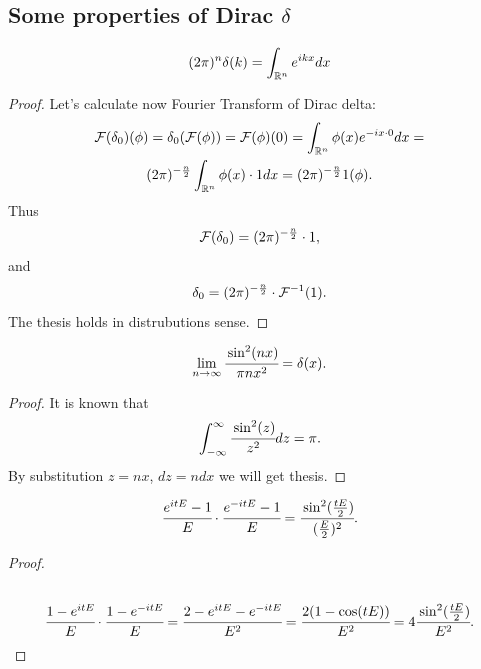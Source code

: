 \documentclass[main.tex]{subfiles}
\begin{document}
\subsection{Some properties of Dirac $\delta$}
\label{dirac-delta-basic}
\begin{fact}
\begin{equation}
\\
(2\pi)^{n}\delta(k) = \int_{\mathbb{R}^n} e^{ikx}dx\\
\end{equation}
\end{fact}
\begin{proof}
Let's calculate now Fourier Transform of Dirac delta:
\begin{multline}
\mathcal{F}(\delta_0)(\phi) = \delta_0 (\mathcal{F}(\phi)) = \mathcal{F}(\phi)(0) =  \int_{\mathbb{R}^n} \phi(x) e^{-ix\cdot 0}dx = \\
(2\pi)^{-\frac{n}{2}} \int_{\mathbb{R}^n} \phi(x) \cdot 1 dx =  (2\pi)^{-\frac{n}{2}} 1(\phi).
\\
\end{multline}
Thus
\begin{equation}
\mathcal{F}(\delta_0) = (2\pi)^{-\frac{n}{2}} \cdot 1,
\end{equation}
and 
\begin{equation}
\delta_0 = (2\pi)^{-\frac{n}{2}} \cdot \mathcal{F}^{-1}(1).
\end{equation}
The thesis holds in distrubutions sense.
\end{proof}
\begin{fact}
\begin{equation}
\label{sin2-delta}
\lim_{n\to \infty} \cfrac{\sin^2(nx)}{\pi nx^2} = \delta(x).
\end{equation}
\end{fact}
\begin{proof}
It is known that
\begin{equation}
\int_{-\infty}^{\infty}\cfrac{\sin^2(z)}{z^2}dz = \pi.
\end{equation}
By substitution $z = nx$, $dz = ndx$ we will get thesis.
\end{proof}

\begin{lemma}
\begin{equation}
\cfrac{e^{itE} - 1}{E}\cdot \cfrac{e^{-itE} - 1}{E} = \cfrac{\sin^2(\frac{tE}{2})}{(\frac{E}{2})^2}.
\end{equation}
\end{lemma}
\begin{proof}
\begin{multline*}\\
\cfrac{1 - e^{itE}}{E}\cdot \cfrac{1 - e^{-itE}}{E} = \cfrac{2 - e^{itE} - e^{-itE}}{E^2}
= \cfrac{2(1 - \cos(tE))}{E^2} = 4 \cfrac{\sin^2(\frac{tE}{2})}{E^2}.
\end{multline*}
\end{proof}
\end{document}
